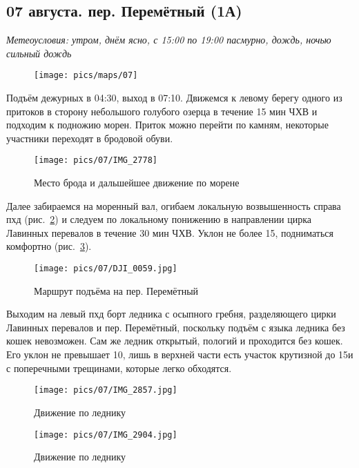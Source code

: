 \subsection{07 августа. пер. Перемётный (1А)}
\textit{Метеоусловия: утром, днём ясно, с 15:00 по 19:00 пасмурно, дождь, ночью сильный дождь}

\begin{figure}[h!]
	\centering
	\texttt{[image: pics/maps/07]}
	\label{fig:07}
\end{figure}

Подъём дежурных в 04:30, выход в 07:10. Движемся к левому берегу одного из притоков в сторону небольшого голубого озерца в течение 15 мин ЧХВ и подходим к подножию морен. Приток можно перейти по камням, некоторые участники переходят в бродовой обуви.

\begin{figure}[h!]
	\centering
	\texttt{[image: pics/07/IMG\_2778]}
	\caption{Место брода и дальшейшее движение по морене}
	\label{fig:img2778}
\end{figure}

Далее забираемся на моренный вал, огибаем локальную возвышенность справа пхд (рис.~\ref{fig:img2778}) и следуем по локальному понижению в направлении цирка Лавинных перевалов в течение 30 мин ЧХВ. Уклон не более 15\degree, подниматься комфортно (рис.~\ref{fig:DJI_0059.jpg}).

\begin{figure}[h!]
	\centering
	\texttt{[image: pics/07/DJI\_0059.jpg]}
	\caption{Маршрут подъёма на пер. Перемётный}
	\label{fig:DJI_0059.jpg}
\end{figure}

Выходим на левый пхд борт ледника с осыпного гребня, разделяющего цирки Лавинных перевалов и пер. Перемётный, поскольку подъём с языка ледника без кошек невозможен. Сам же ледник открытый, пологий и проходится без кошек. Его уклон не превышает 10\degree, лишь в верхней части есть участок крутизной до 15\degree и с поперечными трещинами, которые легко обходятся.

\begin{figure}[h!]
	\centering
	\texttt{[image: pics/07/IMG\_2857.jpg]}
	\caption{Движение по леднику}
	\label{fig:IMG_2857.jpg}
\end{figure}

\begin{figure}[h!]
	\centering
	\texttt{[image: pics/07/IMG\_2904.jpg]}
	\caption{Движение по леднику}
	\label{fig:IMG_2904.jpg}
\end{figure}

